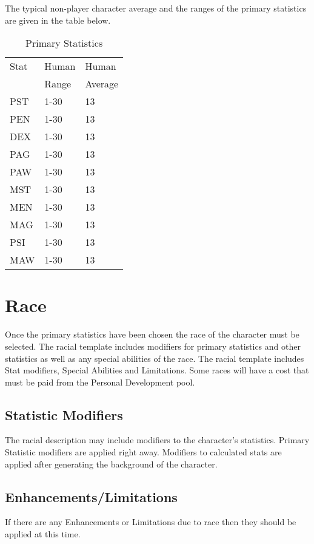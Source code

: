 The typical non-player character average and the ranges of the primary statistics are given in the table
below.

\begin{table}[h]
	\begin{tabular}{lll}
	Stat & Human    & Human   \\
         & Range	& Average  \\
	\hline
	PST & 1-30		& 13  \\
	PEN & 1-30		& 13  \\
	DEX & 1-30		& 13  \\
	PAG & 1-30		& 13  \\
	PAW & 1-30		& 13  \\
	MST & 1-30		& 13  \\
	MEN & 1-30		& 13  \\
	MAG & 1-30		& 13   \\
	PSI & 1-30		& 13   \\
	MAW & 1-30		& 13  \\
	\end{tabular}
    \caption{Primary Statistics}
\end{table}

\section{Race}

Once the primary statistics have been chosen the race of the character
must be selected. The racial template includes modifiers for primary
statistics and other statistics as well as any special abilities of the
race. The racial template includes Stat modifiers, Special Abilities and
Limitations. Some races will have a cost that must be paid from the 
Personal Development pool.

\subsection{Statistic Modifiers}

The racial description may include modifiers to the character's statistics.
Primary Statistic modifiers are applied right away. Modifiers to calculated 
stats are applied after generating the background of the character.

\subsection{Enhancements/Limitations}

If there are any Enhancements or Limitations due to race
then they should be applied at this time.

